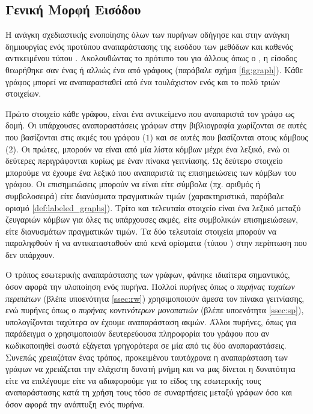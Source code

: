 \subsection{Γενική Μορφή Εισόδου}
Η ανάγκη σχεδιαστικής ενοποίησης όλων των πυρήνων οδήγησε και στην ανάγκη δημιουργίας ενός προτύπου αναπαράστασης της εισόδου των μεθόδων  και  καθενός αντικειμένου τύπου .
Ακολουθώντας το πρότυπο του  για άλλους  όπως ο , η είσοδος θεωρήθηκε σαν ένας \textit{} ή αλλιώς ένα  από γράφους (παράβαλε σχήμα \ref{fig:graph}).
Κάθε γράφος μπορεί να αναπαρασταθεί από ένα  τουλάχιστον ενός και το πολύ τριών στοιχείων.\par
Πρώτο στοιχείο κάθε γράφου, είναι ένα αντικείμενο που αναπαριστά τον γράφο ως δομή.
Οι υπάρχουσες αναπαραστάσεις γράφων στην βιβλιογραφία χωρίζονται σε αυτές που βασίζονται στις ακμές του γράφου ($1$) και σε αυτές που βασίζονται στους κόμβους ($2$).
Οι πρώτες, μπορούν να είναι από μία λίστα κόμβων μέχρι ένα λεξικό, ενώ οι δεύτερες περιγράφονται κυρίως με έναν πίνακα γειτνίασης. 
Ως δεύτερο στοιχείο μπορούμε να έχουμε ένα λεξικό που αναπαριστά τις επισημειώσεις των κόμβων του γράφου.
Οι επισημειώσεις μπορούν να είναι είτε σύμβολα (πχ. αριθμός ή συμβολοσειρά) είτε διανύσματα πραγματικών τιμών (χαρακτηριστικά, παράβαλε ορισμό \ref{def:labeled_graphs}).
Τρίτο και τελευταία στοιχείο είναι ένα λεξικό μεταξύ ζευγαριών κόμβων για όλες τις υπάρχουσες ακμές, είτε συμβολικών επισημειώσεων, είτε διανυσμάτων πραγματικών τιμών.
Τα δύο τελευταία στοιχεία μπορούν να παραληφθούν ή να αντικατασταθούν από κενά ορίσματα (τύπου ) στην περίπτωση που δεν υπάρχουν.\par
Ο τρόπος εσωτερικής αναπαράστασης των γράφων, φάνηκε ιδιαίτερα σημαντικός, όσον αφορά την υλοποίηση ενός πυρήνα.
Πολλοί πυρήνες όπως ο \textit{πυρήνας τυχαίων περιπάτων} (βλέπε υποενότητα \ref{ssec:rw}) χρησιμοποιούν άμεσα τον πίνακα γειτνίασης, ενώ πυρήνες όπως ο \textit{πυρήνας κοντινότερων μονοπατιών} (βλέπε υποενότητα \ref{ssec:sp}), υπολογίζονται ταχύτερα αν έχουμε αναπαράσταση ακμών.
Άλλοι πυρήνες, όπως για παράδειγμα ο  χρησιμοποιούν δευτερεύουσα πληροφορία του γράφου που αν κωδικοποιηθεί σωστά εξάγεται γρηγορότερα σε μία από τις δύο αναπαραστάσεις.
Συνεπώς χρειαζόταν ένας τρόπος, προκειμένου ταυτόχρονα η αναπαράσταση των γράφων να χρειάζεται την ελάχιστη δυνατή μνήμη και να μας δίνεται η δυνατότητα είτε να επιλέγουμε είτε να αδιαφορούμε για το είδος της εσωτερικής τους αναπαράστασης κατά τη χρήση τους τόσο σε συναρτήσεις μεταξύ γράφων όσο και όσον αφορά την ανάπτυξη ενός πυρήνα.
